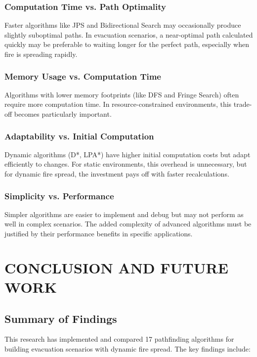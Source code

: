 \documentclass[11pt,a4paper]{report}
\begin{document}
\subsection{Computation Time vs. Path Optimality}
Faster algorithms like JPS and Bidirectional Search may occasionally produce slightly suboptimal paths. In evacuation scenarios, a near-optimal path calculated quickly may be preferable to waiting longer for the perfect path, especially when fire is spreading rapidly.

\subsection{Memory Usage vs. Computation Time}
Algorithms with lower memory footprints (like DFS and Fringe Search) often require more computation time. In resource-constrained environments, this trade-off becomes particularly important.

\subsection{Adaptability vs. Initial Computation}
Dynamic algorithms (D*, LPA*) have higher initial computation costs but adapt efficiently to changes. For static environments, this overhead is unnecessary, but for dynamic fire spread, the investment pays off with faster recalculations.

\subsection{Simplicity vs. Performance}
Simpler algorithms are easier to implement and debug but may not perform as well in complex scenarios. The added complexity of advanced algorithms must be justified by their performance benefits in specific applications.

\chapter{CONCLUSION AND FUTURE WORK}

\section{Summary of Findings}
This research has implemented and compared 17 pathfinding algorithms for building evacuation scenarios with dynamic fire spread. The key findings include:
\end{document}
